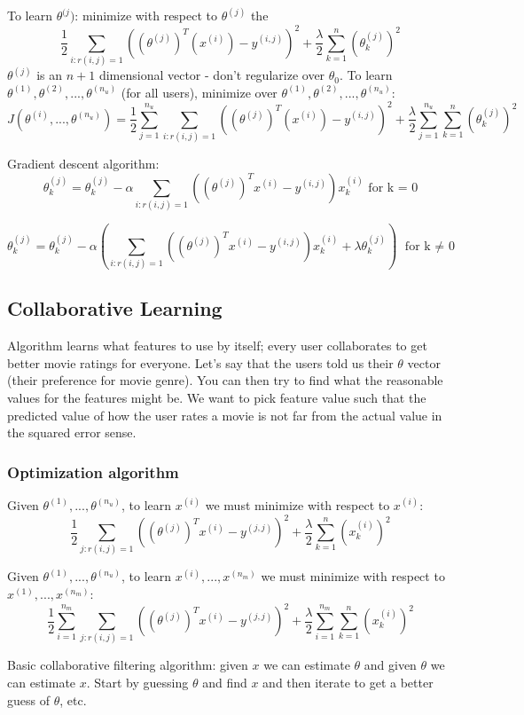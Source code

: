 \documentclass[11pt,letterpaper]{article}
\begin{document}
To learn $\theta^{(j})$: minimize with respect to $\theta^{(j)}$ the 
$$ \frac{1}{2} \sum_{i:r(i,j)=1}((\theta^{(j)})^T(x^{(i)}) - y^{(i,j)})^2 + \frac{\lambda}{2}\sum_{k=1}^{n}(\theta_k^{(j)})^2$$
$\theta^{(j)}$ is an $n + 1$ dimensional vector - don't regularize over $\theta_0$. 
To learn $\theta^{(1)}, \theta^{(2)}, ..., \theta^{(n_u)}$ (for all users), minimize over $\theta^{(1)}, \theta^{(2)}, ..., \theta^{(n_u)}$:
$$ J(\theta^{(i)},...,\theta^{(n_u)}) = \frac{1}{2} \sum_{j=1}^{n_u} \sum_{i:r(i,j)=1}((\theta^{(j)})^T(x^{(i)}) - y^{(i,j)})^2 + \frac{\lambda}{2}\sum_{j=1}^{n_u}\sum_{k=1}^{n}(\theta_k^{(j)})^2$$

Gradient descent algorithm:
$$\theta_k^{(j)} = \theta_k^{(j)} - \alpha \sum_{i:r(i,j)=1}((\theta^{(j)})^Tx^{(i)} - y^{(i,j)})x_k^{(i)} \textrm{ for k = 0}$$

$$\theta_k^{(j)} = \theta_k^{(j)} - \alpha( \sum_{i:r(i,j)=1}((\theta^{(j)})^Tx^{(i)} - y^{(i,j)})x_k^{(i)}+ \lambda \theta_k^{(j)} ) \textrm{ for k $\neq$ 0}$$

\subsection{Collaborative Learning}
Algorithm learns what features to use by itself; every user collaborates to get better movie ratings for everyone. Let's say that the users told us their $\theta$ vector (their preference for movie genre). You can then try to find what the reasonable values for the features might be. We want to pick feature value such that the predicted value of how the user rates a movie is not far from the actual value in the squared error sense. 

\subsubsection{Optimization algorithm}
Given $\theta^{(1)}, ..., \theta^{(n_u)}$, to learn $x^{(i)}$ we must minimize with respect to $x^{(i)}$:
$$ \frac{1}{2} \sum_{j:r(i,j)=1}((\theta^{(j)})^Tx^{(i)} - y^{(j,j)})^2 + \frac{\lambda}{2} \sum_{k=1}^n(x_k^{(i)})^2 $$

Given $\theta^{(1)}, ..., \theta^{(n_u)}$, to learn $x^{(i)},...,x^{(n_m)}$ we must minimize with respect to $x^{(1)},...,x^{(n_m)}$:
$$ \frac{1}{2} \sum_{i=1}^{n_m}\sum_{j:r(i,j)=1}((\theta^{(j)})^Tx^{(i)} - y^{(j,j)})^2 + \frac{\lambda}{2}\sum_{i=1}^{n_m} \sum_{k=1}^n(x_k^{(i)})^2 $$

Basic collaborative filtering algorithm: given $x$ we can estimate $\theta$ and given $\theta$ we can estimate $x$. Start by guessing $\theta$ and find $x$ and then iterate to get a better guess of $\theta$, etc. 
\end{document}
